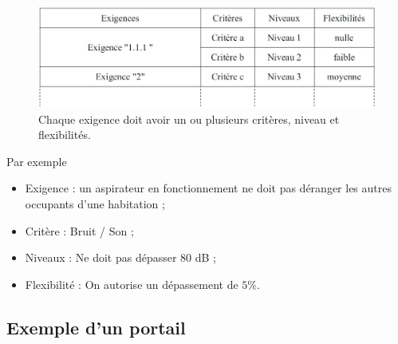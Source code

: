 \documentclass[
	11pt, %
	fleqn, %
	a4paper, %
]{LegrandOrangeBook}
\begin{document}
\begin{figure}[H] %
	\centering %
	\includegraphics[width=1\textwidth]{Images/sys2.JPG} %
	\caption{Chaque exigence doit avoir un ou plusieurs critères, niveau et flexibilités.}
	\label{sys2} %
\end{figure}
Par exemple
\begin{itemize}
    \item Exigence : un aspirateur en fonctionnement ne doit pas déranger les autres occupants d'une habitation ;
    \item Critère : Bruit / Son ;
    \item Niveaux : Ne doit pas dépasser 80 dB ;
    \item Flexibilité : On autorise un dépassement de $5\%$.
\end{itemize}










\subsection{Exemple d'un portail}
\end{document}
